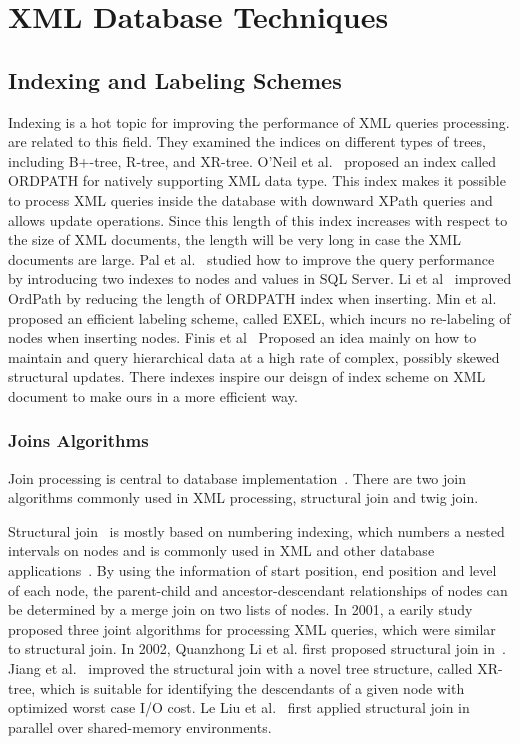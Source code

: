 \section{XML Database Techniques}

\subsection{Indexing and Labeling Schemes}

Indexing is a hot topic for improving the performance of XML queries processing.
\cite{CVZZ08,ToGr02,JLWO03} are related to this field. They examined the indices
on different types of trees, including B+-tree, R-tree, and XR-tree. O'Neil et
al.~\cite{OOPC04} proposed an index called ORDPATH for natively supporting XML
data type. This index makes it possible to process XML queries  inside the
database with downward XPath queries and allows update operations. Since this
length of this index increases with respect to the size of XML documents, the
length will be very long in case the XML documents are large. Pal et
al.~\cite{PCSS04} studied how to improve the query performance by introducing
two indexes to nodes and values in SQL Server. Li et al~\cite{LiLi05} improved
OrdPath by reducing the length of ORDPATH index when inserting. Min et
al.~\cite{MLCh07} proposed an efficient labeling scheme, called EXEL, which
incurs no re-labeling of nodes when inserting nodes. Finis et al~\cite{FBKF15}
Proposed an idea mainly on how to maintain and query hierarchical data at a high
rate of complex, possibly skewed structural updates. There indexes inspire our
deisgn of index scheme on XML document to make ours in a more efficient way.


\subsubsection{Joins Algorithms}

Join processing is central to database implementation~\cite{graefe1993query}.
There are two join algorithms commonly used in XML processing, structural join
and twig join.

Structural join~\cite{AlJYK02} is mostly based on numbering
indexing\cite{numbering}, which numbers a nested intervals on nodes and is
commonly used in XML and other database
applications~\cite{ZNDI01,HAJR03,ZNDI01}. By using the information of start
position, end position and level of each node, the parent-child and
ancestor-descendant relationships of nodes can be determined by a merge join on
two lists of nodes. In 2001, a earily study~\cite{LiMo01} proposed three joint
algorithms for processing XML queries, which were similar to structural join. In
2002, Quanzhong Li et al. first proposed structural join in~\cite{AlJYK02}.
Jiang et al.~\cite{JLWO03} improved the structural join with a novel tree
structure, called XR-tree, which is suitable for identifying the descendants of
a given node with optimized worst case I/O cost. Le Liu et al.~\cite{LFLQ08}
first applied structural join in parallel over shared-memory environments.

